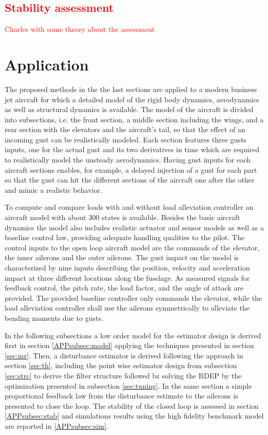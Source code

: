 \documentclass[graybox]{svmult}
\begin{document}
\textcolor{red}{
\section{Stability assessment}\label{sec:st}
Charles with some theory about the assessment
}

\section{Application}\label{sec:app}
The proposed methods in the the last sections are applied to a modern business jet aircraft for which a detailed model of the rigid body dynamics, aerodynamics as well as structural dynamics is available.
The model of the aircraft is divided into subsections, i.e. the front section, a middle section including the wings, and a rear section with the elevators and the aircraft's tail, so that the effect of an incoming gust can be realistically modeled. Each section features three gusts inputs, one for the actual gust and its two derivatives in time which are required to realistically model the unsteady aerodynamics. Having  gust inputs for each aircraft sections enables, for example, a delayed injection of a gust for each part  so that the gust can hit the different sections of the aircraft one after the other and mimic a realistic behavior.
 
To  compute and compare loads with  and without load alleviation controller an aircraft model with about 300 states  is available. Besides the basic aircraft dynamics the model also includes realistic actuator and sensor models as well as a baseline control law, providing adequate handling qualities to the pilot.
The control inputs to the open loop aircraft model are the  commands of the elevator, the inner ailerons and the outer ailerons. 
The gust impact on the model is characterized by  nine inputs describing the position, velocity and acceleration impact at three different locations along the fuselage.
As measured signals for feedback control, the pitch rate, the load factor,  and the angle of attack are provided.
The provided baseline controller only commands the elevator, while  the load alleviation controller shall use the ailerons symmetrically to alleviate the bending moments due to gusts.

In the following subsections a low order model for the estimator design is derived first in section \ref{APPsubsec:model}  applying the techniques presented in section
\ref{sec:mr}. Then, a disturbance estimator is derived following the approach in section \ref{sec:th}, including the point wise estimator design from subsection \ref{sec:strc} to derive the filter structure followed bz solving the RDEP by the optimization presented in subsection \ref{sec:tuning}. In the same section a simple proportional feedback law from the disturbance estimate to the ailerons is presented to close the loop.
The stability of the closed loop is assessed in section \ref{APPsubsec:stab} and simulations results using the high fidelity benchmark model are reported in \ref{APPsubsec:sim}.
\end{document}
